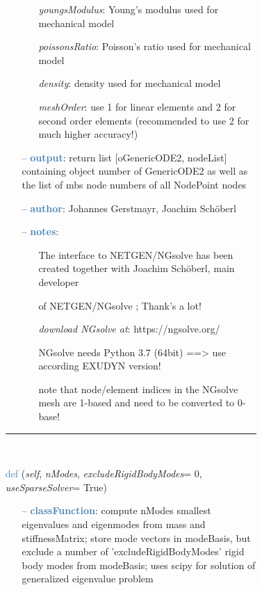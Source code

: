 \begin{itemize}[leftmargin=1.4cm]
\begin{itemize}[leftmargin=1.4cm]
\begin{itemize}[leftmargin=0.5cm]
\begin{itemize}[leftmargin=1.4cm]
\begin{itemize}[leftmargin=1.4cm]
\begin{itemize}[leftmargin=0.5cm]
\begin{itemize}[leftmargin=0.7cm]
\begin{itemize}[leftmargin=1.2cm]
\item[]{\it youngsModulus}: Young's modulus used for mechanical model
\item[]{\it poissonsRatio}: Poisson's ratio used for mechanical model
\item[]{\it density}: density used for mechanical model
\item[]{\it meshOrder}: use 1 for linear elements and 2 for second order elements (recommended to use 2 for much higher accuracy!)
\end{itemize}
\item[--]\textcolor{steelblue}{\bf output}: return list [oGenericODE2, nodeList] containing object number of GenericODE2 as well as the list of mbs node numbers of all NodePoint nodes
\item[--]\textcolor{steelblue}{\bf author}: Johannes Gerstmayr, Joachim Sch\"oberl
\item[--]\textcolor{steelblue}{\bf notes}: \vspace{-6pt}
\begin{itemize}[leftmargin=1.2cm]
\setlength{\itemindent}{-0.7cm}
\item[]The interface to NETGEN/NGsolve has been created together with Joachim Sch\"oberl, main developer
\item[]of NETGEN/NGsolve \cite{Schoeberl1997,NGsolve2014}; Thank's a lot!
\item[]{\it download NGsolve at}: https://ngsolve.org/
\item[]NGsolve needs Python 3.7 (64bit) ==> use according EXUDYN version!
\item[]note that node/element indices in the NGsolve mesh are 1-based and need to be converted to 0-base!
\end{itemize}
\vspace{12pt}\end{itemize}
%
\noindent\rule{8cm}{0.75pt}\vspace{1pt} \\ 
\begin{flushleft}
\noindent \textcolor{steelblue}{def {\bf {}}}\label{sec:FEM:FEMinterface:ComputeEigenmodes}
({\it self}, {\it nModes}, {\it excludeRigidBodyModes}= 0, {\it useSparseSolver}= True)
\end{flushleft}
\setlength{\itemindent}{0.7cm}
\begin{itemize}[leftmargin=0.7cm]
\item[--]\textcolor{steelblue}{\bf classFunction}: compute nModes smallest eigenvalues and eigenmodes from mass and stiffnessMatrix; store mode vectors in modeBasis, but exclude a number of 'excludeRigidBodyModes' rigid body modes from modeBasis; uses scipy for solution of generalized eigenvalue problem

\end{itemize}
\end{itemize}
\end{itemize}
\end{itemize}
\end{itemize}
\end{itemize}
\end{itemize}
